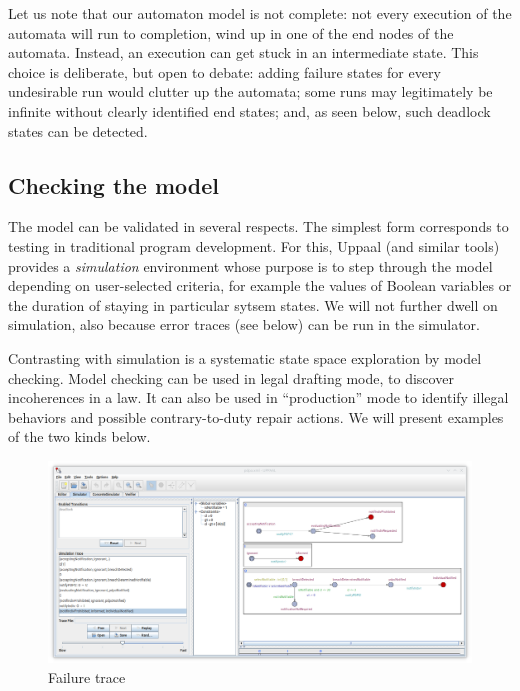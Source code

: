 Let us note that our automaton model is not complete: not every execution of
the automata will run to completion, \ie{} wind up in one of the end nodes of
the automata. Instead, an execution can get stuck in an intermediate
state. This choice is deliberate, but open to debate: adding failure states
for every undesirable run would clutter up the automata; some runs may
legitimately be infinite without clearly identified end states; and, as seen
below, such deadlock states can be detected.

\subsection{Checking the model}\label{sec:checking_the_model}

The model can be validated in several respects. The simplest form corresponds
to testing in traditional program development. For this, Uppaal (and similar
tools) provides a \emph{simulation} environment whose purpose is to step
through the model depending on user-selected criteria, for example the values
of Boolean variables or the duration of staying in particular sytsem
states. We will not further dwell on simulation, also because error traces
(see below) can be run in the simulator.

Contrasting with simulation is a systematic state space exploration by model
checking. Model checking can be used in legal drafting mode, to discover
incoherences in a law. It can also be used in ``production'' mode to identify
illegal behaviors and possible contrary-to-duty repair actions. We will
present examples of the two kinds below.

\begin{figure}[htp]
\centering
\includegraphics[width=\textwidth]{Figures/pdpa_trace.png}
\caption{Failure trace}\label{fig:pdpa_trace}
\end{figure}

